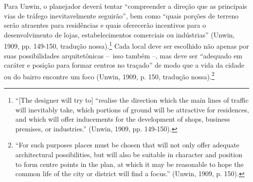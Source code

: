 \documentclass[12pt, a4paper]{book} %
\begin{document}
        Para Unwin, o planejador deverá tentar ``compreender a direção que as principais vias de tráfego inevitavelmente seguirão'', bem como ``quais porções de terreno serão atraentes para residências e quais oferecerão incentivos para o desenvolvimento de lojas, estabelecimentos comerciais ou indústrias'' (Unwin, 1909, pp. 149-150, tradução nossa).\footnote[47]{``[The designer will try to] ``realise the direction which the main lines of traffic will inevitably take, which portions of ground will be attractive for residences, and which will offer inducements for the development of shops, business premises, or industries.'' (Unwin, 1909, pp. 149-150).} Cada local deve ser escolhido não apenas por suas possibilidades arquitetônicas – isso também –, mas deve ser ``adequado em caráter e posição para formar centros no traçado'' de modo que a vida da cidade ou do bairro encontre um foco (Unwin, 1909, p. 150, tradução nossa).\footnote[48]{``For such purposes places must be chosen that will not only offer adequate architectural possibilities, but will also be suitable in character and position to form centre points in the plan, at which it may be reasonable to hope the common life of the city or district will find a focus.'' (Unwin, 1909, p. 150).}  
\end{document}

